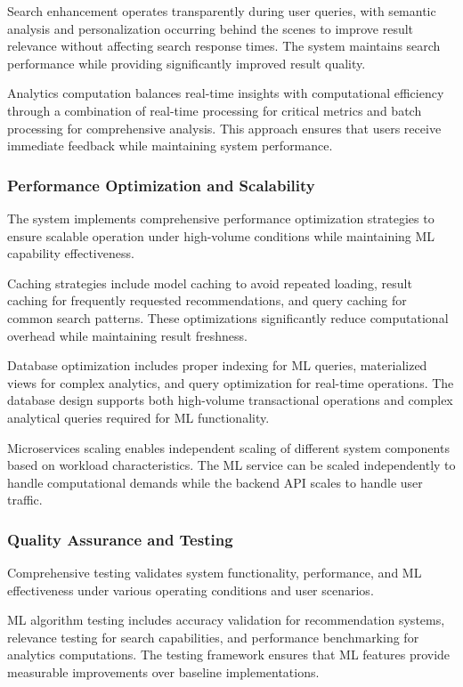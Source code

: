 \documentclass[12pt]{article}
\begin{document}
Search enhancement operates transparently during user queries, with semantic analysis and personalization occurring behind the scenes to improve result relevance without affecting search response times. The system maintains search performance while providing significantly improved result quality.

Analytics computation balances real-time insights with computational efficiency through a combination of real-time processing for critical metrics and batch processing for comprehensive analysis. This approach ensures that users receive immediate feedback while maintaining system performance.

\subsubsection{Performance Optimization and Scalability}
The system implements comprehensive performance optimization strategies to ensure scalable operation under high-volume conditions while maintaining ML capability effectiveness.

Caching strategies include model caching to avoid repeated loading, result caching for frequently requested recommendations, and query caching for common search patterns. These optimizations significantly reduce computational overhead while maintaining result freshness.

Database optimization includes proper indexing for ML queries, materialized views for complex analytics, and query optimization for real-time operations. The database design supports both high-volume transactional operations and complex analytical queries required for ML functionality.

Microservices scaling enables independent scaling of different system components based on workload characteristics. The ML service can be scaled independently to handle computational demands while the backend API scales to handle user traffic.

\subsubsection{Quality Assurance and Testing}
Comprehensive testing validates system functionality, performance, and ML effectiveness under various operating conditions and user scenarios.

ML algorithm testing includes accuracy validation for recommendation systems, relevance testing for search capabilities, and performance benchmarking for analytics computations. The testing framework ensures that ML features provide measurable improvements over baseline implementations.
\end{document}
